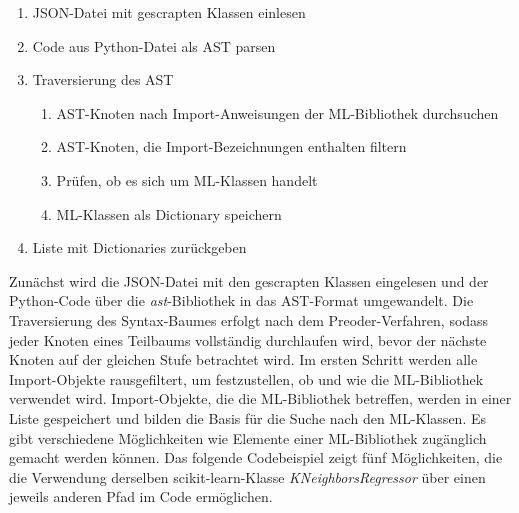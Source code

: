 \documentclass[german,bachelor]{swsLeipzig}
\begin{document}
\begin{enumerate}
 \item JSON-Datei mit gescrapten Klassen einlesen
 \item Code aus Python-Datei als AST parsen
 \item Traversierung des AST
\begin{enumerate}
    \item AST-Knoten nach Import-Anweisungen der ML-Bibliothek durchsuchen
    \item AST-Knoten, die Import-Bezeichnungen enthalten filtern
    \item Prüfen, ob es sich um ML-Klassen handelt
    \item ML-Klassen als Dictionary speichern
    \end{enumerate}
 \item Liste mit Dictionaries zurückgeben
\end{enumerate}

\noindent Zunächst wird die JSON-Datei mit den gescrapten Klassen eingelesen und der Python-Code über die \textit{ast}-Bibliothek in das AST-Format umgewandelt.
Die Traversierung des Syntax-Baumes erfolgt nach dem Preoder-Verfahren, sodass jeder Knoten eines Teilbaums vollständig
durchlaufen wird, bevor der nächste Knoten auf der gleichen Stufe betrachtet wird.
Im ersten Schritt werden alle Import-Objekte rausgefiltert, um festzustellen, ob und wie die ML-Bibliothek verwendet wird.
Import-Objekte, die die ML-Bibliothek betreffen, werden in einer Liste gespeichert und bilden die Basis für die Suche nach
den ML-Klassen.
Es gibt verschiedene Möglichkeiten wie Elemente einer ML-Bibliothek zugänglich gemacht werden können.
Das folgende Codebeispiel zeigt fünf Möglichkeiten, die die Verwendung derselben scikit-learn-Klasse \textit{KNeighborsRegressor}
über einen jeweils anderen Pfad im Code ermöglichen. \\
\end{document}

